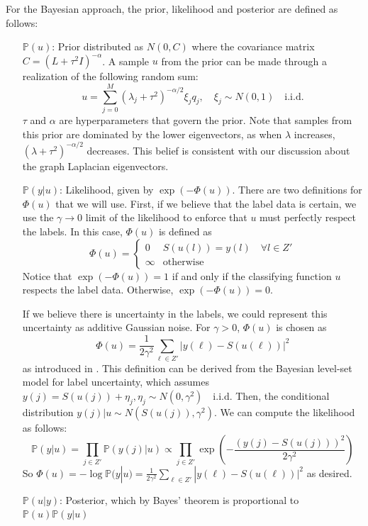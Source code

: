 \documentclass{siamart1116}
\begin{document}
For the Bayesian approach, the prior, likelihood and posterior are defined as follows:
\begin{itemize}
\item[$\mathbb{P}(u)$:] Prior distributed as $N(0,C)$ where the covariance matrix $C = (L + \tau^2I)^{-\alpha}$. A sample $u$ from the prior can be made through a realization of the following random sum:
\begin{equation}
\label{eqn:prior}
u = \sum_{j=0}^M (\lambda_j + \tau^2)^{-\alpha/2}\xi_j q_j,\quad \xi_j\sim N(0,1) \quad \text{i.i.d.}
\end{equation}
$\tau$ and $\alpha$ are hyperparameters that govern the prior. Note that samples from this prior are dominated by the lower eigenvectors, as when $\lambda$ increases, $(\lambda + \tau^2)^{-\alpha/2}$ decreases. This belief is consistent with our discussion about the graph Laplacian eigenvectors.

\item[$\mathbb{P}(y|u)$:] Likelihood, given by $\exp(-\Phi(u))$. There are two definitions for $\Phi(u)$ that we will use.
First, if we believe that the label data is certain, we use the $\gamma\to 0$ limit of the likelihood to enforce that $u$ must perfectly respect the labels. In this case, $\Phi(u)$ is defined as
\begin{equation}
\label{eqn:gammatozero}
\Phi(u) = \begin{cases}
0 & S(u(l)) = y(l) \quad \forall l \in Z'\\
\infty & \text{otherwise}
\end{cases}
\end{equation}
Notice that $\exp(-\Phi(u)) = 1$ if and only if the classifying function $u$ respects the label data. Otherwise, $\exp(-\Phi(u)) = 0$.

If we believe there is uncertainty in the labels, we could represent this uncertainty as additive Gaussian noise. For $\gamma > 0$, $\Phi(u)$ is chosen as
\begin{equation}
\label{eqn:likelihood}
\Phi(u) = \displaystyle \frac{1}{2\gamma^2}\sum_{\ell\in Z'}|y(\ell)-S(u(\ell))|^2
\end{equation}
as introduced in \cite{BLS}. This definition can be derived from the Bayesian level-set model for label uncertainty, which assumes $y(j) = S(u(j)) + \eta_j, \eta_j \sim N(0,\gamma^2) \quad \text{i.i.d.}$ Then, the conditional distribution $y(j) | u \sim N(S(u(j)),\gamma^2)$. We can compute the likelihood as follows:
\[ \mathbb{P}(y|u) = \prod_{j\in Z'} \mathbb{P}(y(j)|u) \propto \prod_{j\in Z'} \exp\left(-\frac{(y(j)-S(u(j)))^2} {2\gamma^2}\right)\]
So $\Phi(u) = -\log \mathbb{P}(y|u) = \frac{1}{2\gamma^2}\sum_{\ell\in Z'}|y(\ell)-S(u(\ell))|^2$ as desired.

\item[$\mathbb{P}(u|y)$:] Posterior, which by Bayes' theorem is proportional to $\mathbb{P}(u) \mathbb{P}(y | u)$
\end{itemize}
\end{document}
